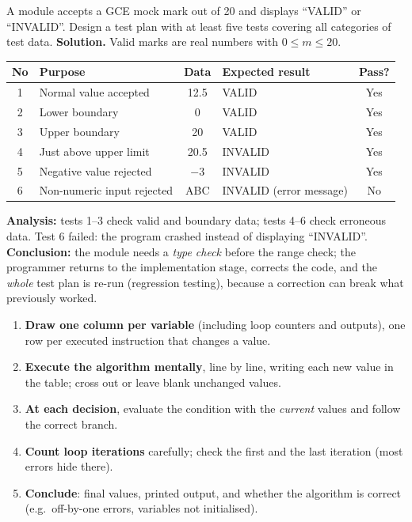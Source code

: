 \documentclass[11pt]{article}
\begin{document}
\begin{exoresolu}
A module accepts a GCE mock mark out of 20 and displays ``VALID'' or ``INVALID''. Design a test plan with at least five tests covering all categories of test data.
\tcblower
\textbf{Solution.} Valid marks are real numbers with $0 \leq m \leq 20$.

\begin{center}
\begin{tabularx}{\linewidth}{|c|X|c|X|c|}
\hline
\rowcolor{popblueL} \textbf{No} & \textbf{Purpose} & \textbf{Data} & \textbf{Expected result} & \textbf{Pass?} \\
\hline
1 & Normal value accepted & 12.5 & VALID & Yes \\
\hline
2 & Lower boundary & 0 & VALID & Yes \\
\hline
3 & Upper boundary & 20 & VALID & Yes \\
\hline
4 & Just above upper limit & 20.5 & INVALID & Yes \\
\hline
5 & Negative value rejected & $-3$ & INVALID & Yes \\
\hline
6 & Non-numeric input rejected & ABC & INVALID (error message) & No \\
\hline
\end{tabularx}
\end{center}

\textbf{Analysis:} tests 1--3 check valid and boundary data; tests 4--6 check erroneous data. Test 6 failed: the program crashed instead of displaying ``INVALID''. \textbf{Conclusion:} the module needs a \emph{type check} before the range check; the programmer returns to the implementation stage, corrects the code, and the \emph{whole} test plan is re-run (regression testing), because a correction can break what previously worked.
\end{exoresolu}

\begin{methode}
\begin{enumerate}
\item \textbf{Draw one column per variable} (including loop counters and outputs), one row per executed instruction that changes a value.
\item \textbf{Execute the algorithm mentally}, line by line, writing each new value in the table; cross out or leave blank unchanged values.
\item \textbf{At each decision}, evaluate the condition with the \emph{current} values and follow the correct branch.
\item \textbf{Count loop iterations} carefully; check the first and the last iteration (most errors hide there).
\item \textbf{Conclude}: final values, printed output, and whether the algorithm is correct (e.g.\ off-by-one errors, variables not initialised).
\end{enumerate}
\end{methode}
\end{document}
